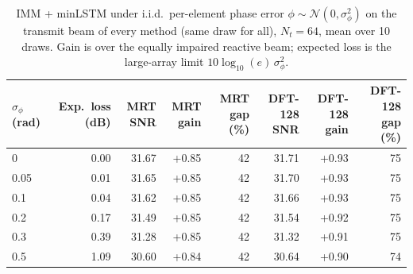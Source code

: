 \begin{table}[t]
\centering
\caption{IMM + minLSTM under i.i.d.\ per-element phase error $\phi\sim\mathcal{N}(0,\sigma_\phi^2)$ on the transmit beam of every method (same draw for all), $N_t{=}64$, mean over 10 draws. Gain is over the equally impaired reactive beam; expected loss is the large-array limit $10\log_{10}(e)\,\sigma_\phi^2$.}\label{tab:phasenoise}
\begin{tabular}{lrrrrrrr}
\toprule
$\sigma_\phi$ (rad) & Exp.\ loss (dB) & MRT SNR & MRT gain & MRT gap (\%) & DFT-128 SNR & DFT-128 gain & DFT-128 gap (\%) \\
\midrule
0 & 0.00 & 31.67 & +0.85 & 42 & 31.71 & +0.93 & 75 \\
0.05 & 0.01 & 31.65 & +0.85 & 42 & 31.70 & +0.93 & 75 \\
0.1 & 0.04 & 31.62 & +0.85 & 42 & 31.66 & +0.93 & 75 \\
0.2 & 0.17 & 31.49 & +0.85 & 42 & 31.54 & +0.92 & 75 \\
0.3 & 0.39 & 31.28 & +0.85 & 42 & 31.32 & +0.91 & 75 \\
0.5 & 1.09 & 30.60 & +0.84 & 42 & 30.64 & +0.90 & 74 \\
\bottomrule
\end{tabular}
\end{table}
